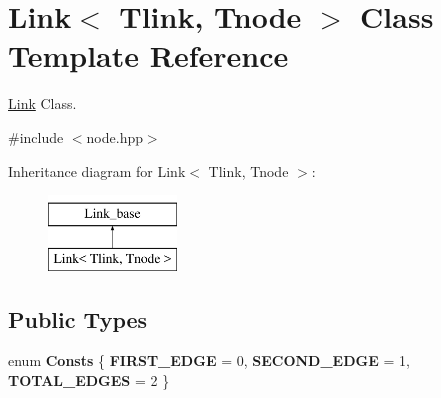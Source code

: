 \hypertarget{classLink}{}\section{Link$<$ Tlink, Tnode $>$ Class Template Reference}
\label{classLink}


\hyperlink{classLink}{Link} Class.  




{\ttfamily \#include $<$node.\+hpp$>$}

Inheritance diagram for Link$<$ Tlink, Tnode $>$\+:\begin{figure}[H]
\begin{center}
\leavevmode
\includegraphics[height=2.000000cm]{classLink}
\end{center}
\end{figure}
\subsection*{Public Types}
\begin{DoxyCompactItemize}
\item 
enum {\bfseries Consts} \{ {\bfseries F\+I\+R\+S\+T\+\_\+\+E\+D\+GE} = 0, 
{\bfseries S\+E\+C\+O\+N\+D\+\_\+\+E\+D\+GE} = 1, 
{\bfseries T\+O\+T\+A\+L\+\_\+\+E\+D\+G\+ES} = 2
 \}\hypertarget{classLink_ae34fd87a71fc6aa4c6541dc5327e54c0}{}\label{classLink_ae34fd87a71fc6aa4c6541dc5327e54c0}

\end{DoxyCompactItemize}
